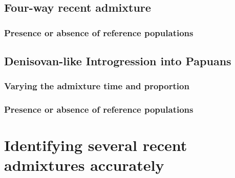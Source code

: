 \subsection{Four-way recent admixture}
\subsubsection{Presence or absence of reference populations}

\subsection{Denisovan-like Introgression into Papuans}
\subsubsection{Varying the admixture time and proportion}
\subsubsection{Presence or absence of reference populations}


\section{Identifying several recent admixtures accurately}
\label{sec:ch2-gb-real}